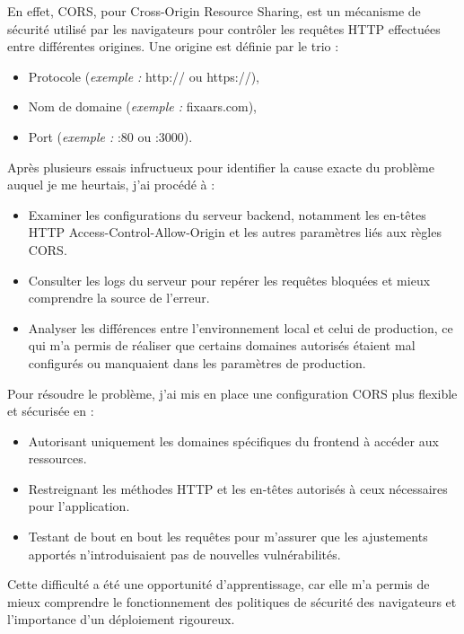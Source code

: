 {En effet, CORS, pour Cross-Origin Resource Sharing, est un mécanisme de sécurité utilisé par les navigateurs pour contrôler les requêtes HTTP effectuées entre différentes origines. Une origine est définie par le trio :

\begin{itemize}
    \item Protocole (\textit{exemple :} http:// ou https://),
    \item Nom de domaine (\textit{exemple :} fixaars.com),
    \item Port (\textit{exemple :} :80 ou :3000).
\end{itemize}

Après plusieurs essais infructueux pour identifier la cause exacte du problème auquel je me heurtais, j'ai procédé à :

\begin{itemize}
    \item Examiner les configurations du serveur backend, notamment les en-têtes HTTP Access-Control-Allow-Origin et les autres paramètres liés aux règles CORS.
    \item Consulter les logs du serveur pour repérer les requêtes bloquées et mieux comprendre la source de l’erreur.
    \item Analyser les différences entre l'environnement local et celui de production, ce qui m’a permis de réaliser que certains domaines autorisés étaient mal configurés ou manquaient dans les paramètres de production.
\end{itemize}

Pour résoudre le problème, j'ai mis en place une configuration CORS plus flexible et sécurisée en :

\begin{itemize}
    \item Autorisant uniquement les domaines spécifiques du frontend à accéder aux ressources.
    \item Restreignant les méthodes HTTP et les en-têtes autorisés à ceux nécessaires pour l'application.
    \item Testant de bout en bout les requêtes pour m'assurer que les ajustements apportés n'introduisaient pas de nouvelles vulnérabilités.
\end{itemize}

Cette difficulté a été une opportunité d'apprentissage, car elle m'a permis de mieux comprendre le fonctionnement des politiques de sécurité des navigateurs et l’importance d’un déploiement rigoureux.

}
